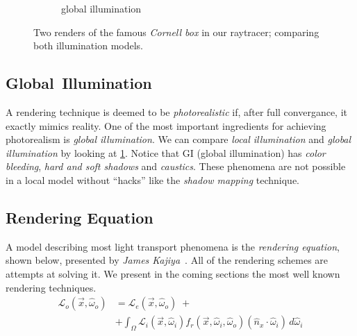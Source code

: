 \documentclass[a4paper, twocolumn]{article}
\begin{document}
\begin{figure}[ht]
\begin{subfigure}{0.48\linewidth}
            \caption{global illumination}
        \end{subfigure}
        \caption{Two renders of the famous \emph{Cornell box} in our raytracer; comparing both illumination models.}
        \label{fig:cornell_box}
    \end{figure}

    \vspace{-1.5em}

    \subsection{Global\, Illumination} \label{sec:global_illumination}

    A rendering technique is deemed to be \emph{photorealistic} if, after full convergance, it exactly mimics reality. One of the most important ingredients for achieving photorealism is \emph{global illumination}. We can compare \emph{local illumination} and \emph{global illumination} by looking at \cref{fig:cornell_box}. Notice that GI (global illumination) has \emph{color bleeding}, \emph{hard and soft shadows} and \emph{caustics}. These phenomena are not possible in a local model without ``hacks'' like the \emph{shadow mapping} technique.

    \subsection{Rendering Equation} \label{sec:rendering_equation}

        A model describing most light transport phenomena is the \emph{rendering equation}, shown below, presented by \emph{James Kajiya}~\cite{kajiya1986rendering}. All of the rendering schemes are attempts at solving it. We present in the coming sections the most well known rendering techniques. \begin{align*}
            \mathcal{L}_o(\vec{x}, \hat{\omega}_o) &= \mathcal{L}_e(\vec{x}, \hat{\omega}_o) \; +\\
                                                   &+ \int_\Omega \mathcal{L}_i(\vec{x}, \hat{\omega}_i)
                                                      f_r(\vec{x}, \hat{\omega}_i, \hat{\omega}_o)
                                                      (\hat{n}_{x} \cdot \hat{\omega}_i) \, d\hat{\omega}_i
        \end{align*}
\end{document}
